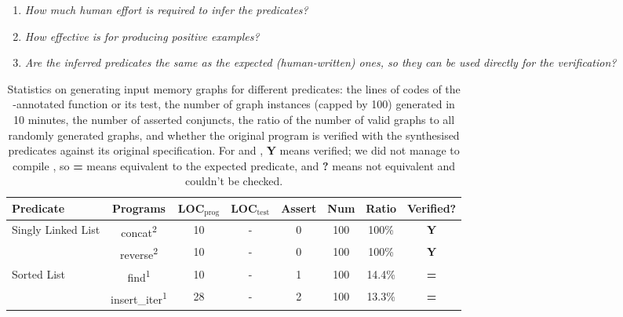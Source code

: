 \begin{enumerate}[label=\textbf{RQ 2.\arabic*},topsep=2pt,leftmargin=40pt]
\item\label{rq21} \emph{How much human effort is required to infer the
    predicates?}
  \item\label{rq22} \emph{How effective is \ggen for producing
      positive examples?}
  \item\label{rq23} \emph{Are the inferred predicates the same as the expected
      (human-written) ones, so they can be used directly for the
      verification?}
  \end{enumerate}

  \begin{table}[t]
    \centering
    \caption{Statistics on generating input memory graphs for different
      predicates: the lines of codes of the -annotated
      function or its test, the number of graph instances
      (capped by 100) generated in 10 minutes, the number of asserted
      conjuncts, 
      the ratio of the number of valid graphs to all randomly
      generated graphs, and whether the original program is verified
      with the synthesised predicates against its original
      specification. 
      For \veri and \grass, \textbf{Y} means verified; we did not manage
      to compile \vcdryad, so \textbf{=} means equivalent to the
      expected predicate, and \textbf{?} means not equivalent and
      couldn't be checked.
    }
    \label{tab:gen}
  {\small{
      \begin{tabular}{l|c|ccccc|c}
        \toprule
        Predicate &Programs &  LOC$_\text{prog}$ & LOC$_\text{test}$ & Assert & Num &Ratio & Verified?\\
        \midrule
        \multirow{2}{*}{{{Singly Linked List}}} & concat\textsuperscript{2} &  10& - & 0& 100 &100\%  & \textbf{Y} \\
        &reverse\textsuperscript{2} &  10& - & 0& 100 &100\%  & \textbf{Y} \\
        \midrule
        \multirow{4}{*}{{{Sorted List}}} & find\textsuperscript{1} &  10& - & 1& 100 &14.4\% & \textbf{=} \\
        &insert\_iter\textsuperscript{1} &  28& - & 2 & 100 &13.3\% & \textbf{=} \\

\end{tabular}}}
\end{table}
